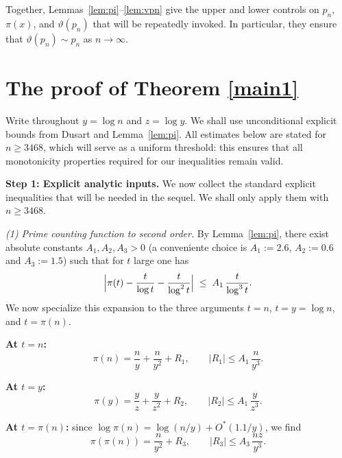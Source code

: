 \documentclass[10pt]{amsart}
\theoremstyle{definition} %
\numberwithin{equation}{section}
\begin{document}
\smallskip
Together, Lemmas~\ref{lem:pi}–\ref{lem:vpn} give the upper and lower controls on
$p_n$, $\pi(x)$, and $\vartheta(p_n)$ that will be repeatedly invoked. In
particular, they ensure that $\vartheta(p_n)\sim p_n$ as $n\to\infty$.


\section{The proof of Theorem \ref{main1}}\label{M1}

Write throughout $y=\log n$ and $z=\log y$. We shall use unconditional explicit 
bounds from Dusart \cite{b1} and Lemma~\ref{lem:pi}. All estimates below are 
stated for $n\ge 3468$, which will serve as a uniform threshold: this ensures that all monotonicity properties required for our inequalities remain valid.

\medskip
\noindent\textbf{Step 1: Explicit analytic inputs.}
We now collect the standard explicit inequalities that will be needed in the sequel. 
We shall only apply them with $n\ge 3468$.

\medskip
\emph{(1) Prime counting function to second order.}
By Lemma~\ref{lem:pi}, there exist absolute constants 
$A_1,A_2,A_3>0$ (a conveniente choice is $A_1:=2.6$, $A_2:=0.6$ and $A_3:=1.5$) such that for $t$ large one has
\begin{equation}\label{eq:pi-2nd}
\Bigl|\pi(t)-\frac{t}{\log t}-\frac{t}{\log^2 t}\Bigr|
\;\le\; A_1\,\frac{t}{\log^3 t}.
\end{equation}
We now specialize this expansion to the three arguments $t=n$, $t=y=\log n$, and 
$t=\pi(n)$.

\smallskip   

\textbf{At $t=n$:}
\begin{equation}\label{eq:pin-exp}
  \pi(n)=\frac{n}{y}+\frac{n}{y^2}+R_1,
\qquad |R_1|\le A_1\,\frac{n}{y^3}.  
\end{equation}


\smallskip


\textbf{At $t=y$:}
\begin{equation}\label{eq:piy-exp}
\pi(y)=\frac{y}{z}+\frac{y}{z^2}+R_2,
\qquad |R_2|\le A_1\,\frac{y}{z^3}.
\end{equation}

\smallskip
\textbf{At $t=\pi(n)$:}
since $\log \pi(n)=\log(n/y)+O^*(1.1/y)$, we find
\begin{equation}\label{eq:pipin-exp}
\pi(\pi(n))=\frac{n}{y^2}+R_3,
\qquad |R_3|\le A_3\,\frac{n z}{y^3}.
\end{equation}
\end{document}

